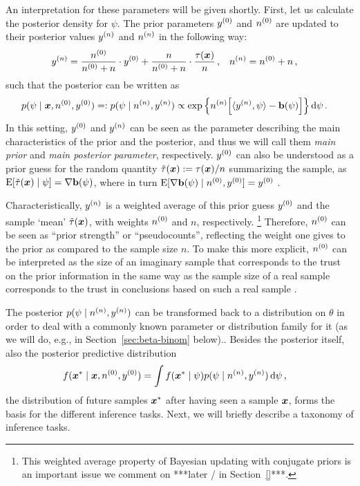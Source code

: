 An interpretation for these parameters will be given shortly.
First, let us calculate the posterior density for $\psi$.
The prior parameters $y^{(0)}$ and $n^{(0)}$ are updated to their posterior values $y^{(n)}$ and $n^{(n)}$ in the following way:
\begin{align}\label{eq:canonicalupdate}
y^{(n)} &= \frac{n^{(0)}}{n^{(0)} + n} \cdot y^{(0)} + \frac{n}{n^{(0)} + n} \cdot \frac{\tau({\bm x})}{n}\,, &
n^{(n)} &= n^{(0)} + n\,,
\end{align}
such that the posterior can be written as
\begin{align}\label{eq:canonicalposterior}
p(\psi \mid {\bm x}, n^{(0)}, y^{(0)})
 =: p(\psi \mid n^{(n)}, y^{(n)})
 &\propto \exp\Big\{ n^{(n)} \Big[ \langle y^{(n)}, \psi \rangle - \mathbf{b}(\psi) \Big] \Big\} \,\mathrm{d}\psi\,.
\end{align}
In this setting, $y^{(0)}$ and $y^{(n)}$ can be seen as the parameter describing the main characteristics of the prior and the posterior,
and thus we will call them \emph{main prior} and \emph{main posterior parameter}, respectively.
$y^{(0)}$ can also be understood as a prior guess for the random quantity $\tilde{\tau}({\bm x}) := \tau({\bm x})/n$ summarizing the sample,
as $\operatorname{E}[\tilde{\tau}({\bm x}) \mid \psi] = \nabla\mathbf{b}(\psi)$,
where in turn $\operatorname{E}[\nabla\mathbf{b}(\psi) \mid n^{(0)}, y^{(0)}] = y^{(0)}$ \parencite[Prop.~5.7, p.~275]{2000:bernardosmith}.

Characteristically, $y^{(n)}$ is a weighted average of this prior guess $y^{(0)}$ and the sample `mean' $\tilde{\tau}({\bm x})$,
with weights $n^{(0)}$ and $n$, respectively.%
\footnote{This weighted average property of Bayesian updating with conjugate priors is an important issue
we comment on ***later / in Section~\ref{}***.}
Therefore, $n^{(0)}$ can be seen as ``prior strength'' or ``pseudocounts'',
reflecting the weight one gives to the prior as compared to the sample size $n$.
To make this more explicit, $n^{(0)}$ can be interpreted as the size of an imaginary sample
that corresponds to the trust on the prior information in the same way
as the sample size of a real sample
corresponds to the trust in conclusions based on such a real sample \parencite[p.~258]{Walter2009a}.

The posterior $p(\psi \mid n^{(n)}, y^{(n)})$ can be transformed back to a distribution on $\theta$
in order to deal with a commonly known parameter or distribution family for it
(as we will do, e.g., in Section~\ref{sec:beta-binom} below)..
Besides the posterior itself, also the posterior predictive distribution
\begin{align}
\label{eq:posteriorpredictive}
f({\bm x}^*\mid{\bm x}, n^{(0)}, y^{(0)}) &= \int f({\bm x}^* \mid \psi) p(\psi \mid n^{(n)}, y^{(n)}) \,\mathrm{d}\psi\,,
\end{align}
the distribution of future samples ${\bm x}^*$ after having seen a sample ${\bm x}$,
forms the basis for the different inference tasks. %
Next, we will briefly describe a taxonomy of inference tasks.


